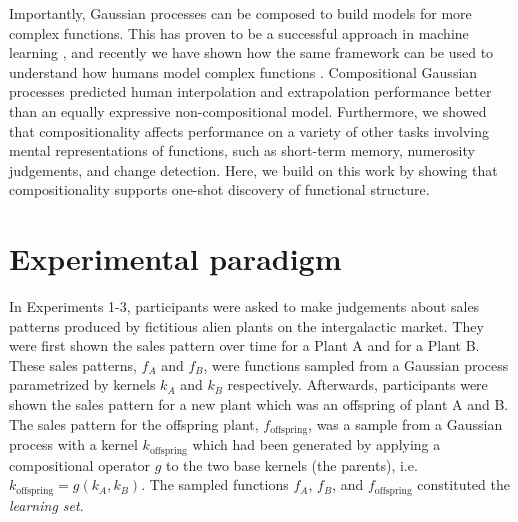 \documentclass[10pt,letterpaper]{article}
\begin{document}
Importantly, Gaussian processes can be composed to build models for more complex functions. This has proven to be a successful approach in machine learning \cite{duvenaud2013structure}, and recently we have shown how the same framework can be used to understand how humans model complex functions \cite{schulz2016compositional, villagrahuman}. Compositional Gaussian processes predicted human interpolation and extrapolation performance better than an equally expressive non-compositional model. Furthermore, we showed that compositionality affects performance on a variety of other tasks involving mental representations of functions, such as short-term memory, numerosity judgements, and change detection. Here, we build on this work by showing that compositionality supports one-shot discovery of functional structure.


\section{Experimental paradigm}\label{sec:osetup}

In Experiments 1-3, participants were asked to make judgements about sales patterns produced by fictitious alien plants on the intergalactic market. They were first shown the sales pattern over time for a Plant A and for a Plant B. These sales patterns, $f_A$ and $f_B$, were functions sampled from a Gaussian process parametrized by kernels $k_A$ and $k_B$ respectively. Afterwards, participants were shown the sales pattern for a new plant which was an offspring of plant A and B. The sales pattern for the offspring plant, $f_{\text{offspring}}$, was a sample from a Gaussian process with a kernel $k_{\text{offspring}}$ which had been generated by applying a compositional operator $g$ to the two base kernels (the parents), i.e. $k_{\text{offspring}}=g(k_A,k_B)$. The sampled functions $f_A$, $f_B$, and $f_{\text{offspring}}$ constituted the \emph{learning set}.
\end{document}
